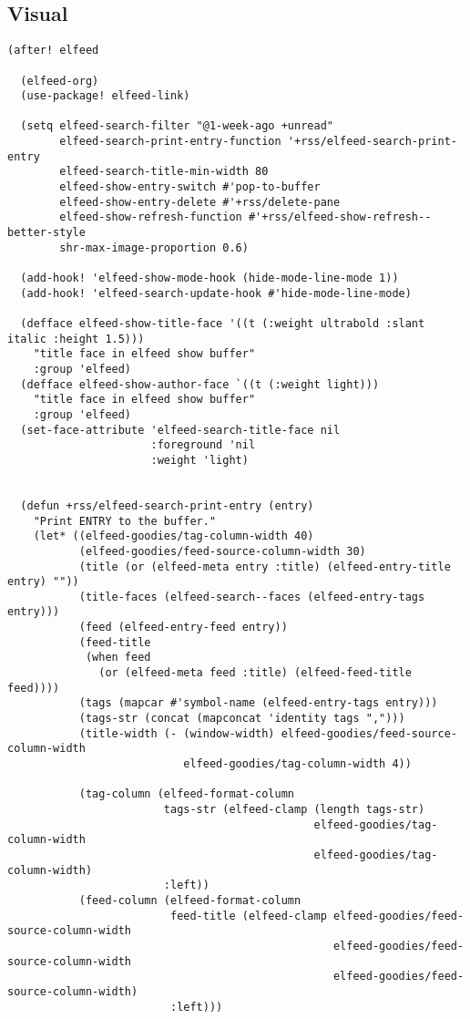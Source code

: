 \documentclass[c]{article}
\theoremstyle{plain}%
\theoremstyle{definition}
\theoremstyle{remark}
\begin{document}
\subsection{Visual}
\label{sec:org42e9924}
\begin{verbatim}
(after! elfeed

  (elfeed-org)
  (use-package! elfeed-link)

  (setq elfeed-search-filter "@1-week-ago +unread"
        elfeed-search-print-entry-function '+rss/elfeed-search-print-entry
        elfeed-search-title-min-width 80
        elfeed-show-entry-switch #'pop-to-buffer
        elfeed-show-entry-delete #'+rss/delete-pane
        elfeed-show-refresh-function #'+rss/elfeed-show-refresh--better-style
        shr-max-image-proportion 0.6)

  (add-hook! 'elfeed-show-mode-hook (hide-mode-line-mode 1))
  (add-hook! 'elfeed-search-update-hook #'hide-mode-line-mode)

  (defface elfeed-show-title-face '((t (:weight ultrabold :slant italic :height 1.5)))
    "title face in elfeed show buffer"
    :group 'elfeed)
  (defface elfeed-show-author-face `((t (:weight light)))
    "title face in elfeed show buffer"
    :group 'elfeed)
  (set-face-attribute 'elfeed-search-title-face nil
                      :foreground 'nil
                      :weight 'light)


  (defun +rss/elfeed-search-print-entry (entry)
    "Print ENTRY to the buffer."
    (let* ((elfeed-goodies/tag-column-width 40)
           (elfeed-goodies/feed-source-column-width 30)
           (title (or (elfeed-meta entry :title) (elfeed-entry-title entry) ""))
           (title-faces (elfeed-search--faces (elfeed-entry-tags entry)))
           (feed (elfeed-entry-feed entry))
           (feed-title
            (when feed
              (or (elfeed-meta feed :title) (elfeed-feed-title feed))))
           (tags (mapcar #'symbol-name (elfeed-entry-tags entry)))
           (tags-str (concat (mapconcat 'identity tags ",")))
           (title-width (- (window-width) elfeed-goodies/feed-source-column-width
                           elfeed-goodies/tag-column-width 4))

           (tag-column (elfeed-format-column
                        tags-str (elfeed-clamp (length tags-str)
                                               elfeed-goodies/tag-column-width
                                               elfeed-goodies/tag-column-width)
                        :left))
           (feed-column (elfeed-format-column
                         feed-title (elfeed-clamp elfeed-goodies/feed-source-column-width
                                                  elfeed-goodies/feed-source-column-width
                                                  elfeed-goodies/feed-source-column-width)
                         :left)))


\end{verbatim}
\end{document}
